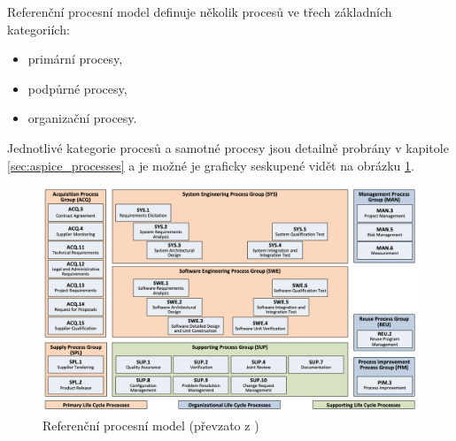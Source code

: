 \documentclass[czech,master,public,dept460,male,cpdeclaration,oneside]{diploma}
\begin{document}
Referenční procesní model definuje několik procesů ve třech základních kategoriích:

\begin{itemize}

\item primární procesy,
\item podpůrné procesy,
\item organizační procesy.

\end{itemize}

Jednotlivé kategorie procesů a samotné procesy jsou detailně probrány v kapitole \ref{sec:aspice_processes} a je možné je graficky seskupené vidět na obrázku \ref{fig:prm}. 
\begin{figure}[!ht]
    \centering
    \includegraphics[width=1\textwidth]{Diplomka/Figures/prm.png}
    \caption{Referenční procesní model (převzato z \cite{ref:aspice_download_prm})}
    \label{fig:prm}
\end{figure}



\end{document}
